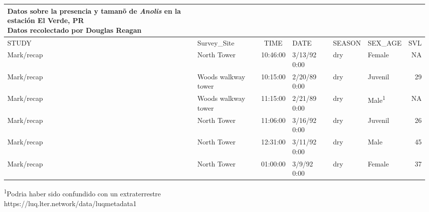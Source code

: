 \captionsetup[table]{labelformat=empty,skip=1pt}
\setlength{\LTpost}{0mm}
\begin{longtable}{llclllr}
\caption*{
{\large Datos sobre la presencia y tamanõ de \emph{Anolis} en la estación El Verde, PR} \\ 
{\small Datos recolectado por Douglas Reagan}
} \\ 
\toprule
STUDY & Survey\_Site & TIME & DATE & SEASON & SEX\_AGE & SVL \\ 
\midrule
Mark/recap & North Tower & 10:46:00 & 3/13/92 0:00 & dry & Female & NA \\ 
Mark/recap & Woods walkway tower & 10:15:00 & 2/20/89 0:00 & dry & Juvenil & 29 \\ 
Mark/recap & Woods walkway tower & 11:15:00 & 2/21/89 0:00 & dry & Male\textsuperscript{1} & NA \\ 
Mark/recap & North Tower & 11:06:00 & 3/16/92 0:00 & dry & Juvenil & 26 \\ 
Mark/recap & North Tower & 12:31:00 & 3/11/92 0:00 & dry & Male & 45 \\ 
Mark/recap & North Tower & 01:00:00 & 3/9/92 0:00 & dry & Female & 37 \\ 
\bottomrule
\end{longtable}
\begin{minipage}{\linewidth}
\textsuperscript{1}Podria haber sido confundido con un extraterrestre\\
https://luq.lter.network/data/luqmetadata1\\
\end{minipage}


